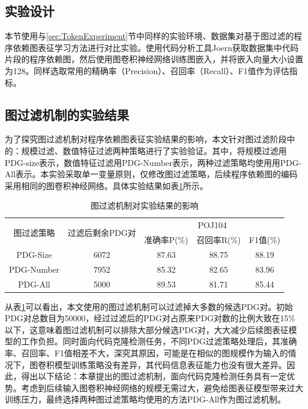 \subsection{实验设计}
\label{sec:PDGDesign}

本节使用与\ref{sec:TokenExperiment}节中同样的实验环境、数据集对基于图过滤的程序依赖图表征学习方法进行对比实验。使用代码分析工具Joern获取数据集中代码片段的程序依赖图，然后使用图卷积神经网络训练图嵌入，并将嵌入向量大小设置为128。同样选取常用的精确率（Precision）、召回率（Recall）、F1值作为评估指标。

\subsection{图过滤机制的实验结果}
\label{subsec:PDGResult1}

为了探究图过滤机制对程序依赖图表征实验结果的影响，本文针对图过滤阶段中的：规模过滤、数值特征过滤两种策略进行了实验验证。其中，将规模过滤用PDG-size表示，数值特征过滤用PDG-Number表示，两种过滤策略均使用用PDG-All表示。本实验采取单一变量原则，仅修改图过滤策略，后续程序依赖图的编码采用相同的图卷积神经网络。具体实验结果如表\ref{tab:graph}所示。

\begin{table}[htp]
  \centering
  \caption{图过滤机制对实验结果的影响} 
  \label{tab:graph}
  \begin{tabular*}{0.9\textwidth}{@{\extracolsep{\fill}}ccccc}
  \toprule
   \multirow{2}{*}{图过滤策略} & \multirow{2}{*}{过滤后剩余PDG对} & \multicolumn{3}{c}{POJ104} \\
  \cmidrule{3-5} 
   & & 准确率P(\%) & 召回率R(\%) & F1值(\%)  \\ 
  \midrule
    PDG-Size		   & 6072	  &87.63	 &88.75		&88.19 \\
    PDG-Number		 & 7952	  &85.32   &82.65   &83.96 \\
    PDG-All		     & 5000	  &89.53   &81.71	 &85.44 \\
  \bottomrule
  \end{tabular*}
\end{table}

从表\ref{tab:graph}可以看出，本文使用的图过滤机制可以过滤掉大多数的候选PDG对。初始PDG对总数目为50000，经过过滤后的PDG对占原来PDG对数的比例大致在15\%以下，这意味着图过滤机制可以排除大部分候选PDG对，大大减少后续图表征模型的工作负担。同时面向代码克隆检测任务，不同PDG过滤策略处理后，其准确率、召回率、F1值相差不大，深究其原因，可能是在相似的图规模作为输入的情况下，图卷积模型训练策略没有差异，其代码信息表征能力也没有很大差异。因此，得出以下结论：本章提出的图过滤机制，面向代码克隆检测任务具有一定优势。考虑到后续输入图卷积神经网络的规模无需过大，避免给图表征模型带来过大训练压力，最终选择两种图过滤策略均使用的方法PDG-All作为图过滤机制。

